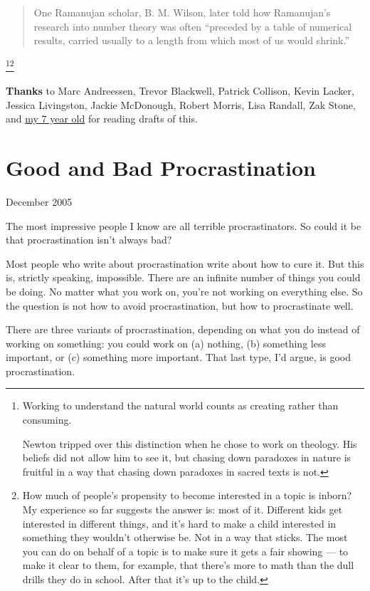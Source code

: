 \documentclass[12pt]{book}
\begin{document}
{\begin{quote}
One Ramanujan scholar, B. M. Wilson, later told how Ramanujan's research
into number theory was often ``preceded by a table of numerical results,
carried usually to a length from which most of us would shrink.''
\end{quote}}\footnote{Working to understand the natural world counts as creating
rather than consuming.

Newton tripped over this distinction when he chose to work on theology.
His beliefs did not allow him to see it, but chasing down paradoxes in
nature is fruitful in a way that chasing down paradoxes in sacred texts
is not.}\footnote{How much of people's propensity to become interested in a topic
is inborn? My experience so far suggests the answer is: most of it.
Different kids get interested in different things, and it's hard to make
a child interested in something they wouldn't otherwise be. Not in a way
that sticks. The most you can do on behalf of a topic is to make sure it
gets a fair showing --- to make it clear to them, for example, that
there's more to math than the dull drills they do in school. After that
it's up to the child.}

\textbf{Thanks} to Marc Andreessen, Trevor Blackwell, Patrick Collison,
Kevin Lacker, Jessica Livingston, Jackie McDonough, Robert Morris, Lisa
Randall, Zak Stone, and
\href{https://twitter.com/paulg/status/1196537802621669376}{my 7 year
old} for reading drafts of this.
\chapter{Good and Bad Procrastination}

December 2005

The most impressive people I know are all terrible procrastinators. So
could it be that procrastination isn't always bad?

Most people who write about procrastination write about how to cure it.
But this is, strictly speaking, impossible. There are an infinite number
of things you could be doing. No matter what you work on, you're not
working on everything else. So the question is not how to avoid
procrastination, but how to procrastinate well.

There are three variants of procrastination, depending on what you do
instead of working on something: you could work on (a) nothing, (b)
something less important, or (c) something more important. That last
type, I'd argue, is good procrastination.
\end{document}
